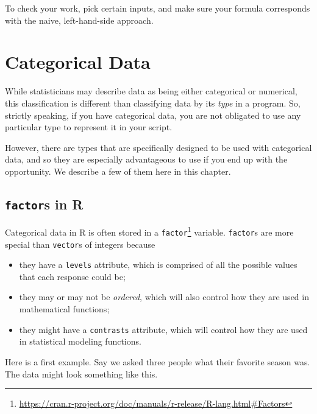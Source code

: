 \documentclass[
  12pt,
]{krantz}
\providecommand{\tightlist}{%
  \setlength{\itemsep}{0pt}\setlength{\parskip}{0pt}}
\renewcommand{\href}[2]{#2\footnote{\url{#1}}}
\begin{document}
To check your work, pick certain inputs, and make sure your formula corresponds with the naive, left-hand-side approach.

\hypertarget{categorical-data}{%
\chapter{Categorical Data}\label{categorical-data}}

While statisticians may describe data as being either categorical or numerical, this classification is different than classifying data by its \emph{type} in a program. So, strictly speaking, if you have categorical data, you are not obligated to use any particular type to represent it in your script.

However, there are types that are specifically designed to be used with categorical data, and so they are especially advantageous to use if you end up with the opportunity. We describe a few of them here in this chapter.

\hypertarget{factors-in-r}{%
\section{\texorpdfstring{\texttt{factor}s in R}{factors in R}}\label{factors-in-r}}

Categorical data in R is often stored in a \href{https://cran.r-project.org/doc/manuals/r-release/R-lang.html\#Factors}{\texttt{factor}} variable. \texttt{factor}s are more special than \texttt{vector}s of integers because

\begin{itemize}
\tightlist
\item
  they have a \texttt{levels} attribute, which is comprised of all the possible values that each response could be;
\item
  they may or may not be \emph{ordered}, which will also control how they are used in mathematical functions;
\item
  they might have a \texttt{contrasts} attribute, which will control how they are used in statistical modeling functions.
\end{itemize}

Here is a first example. Say we asked three people what their favorite season was. The data might look something like this.
\end{document}
